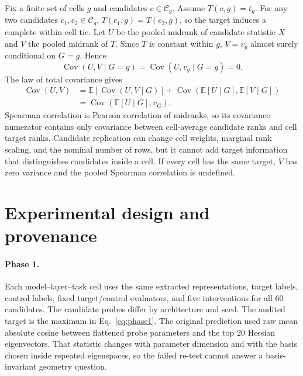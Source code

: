 \documentclass{article}
\begin{document}
Fix a finite set of cells $g$ and candidates $c\in\mathcal C_g$. Assume $T(c,g)=t_g$. For any two candidates $c_1,c_2\in\mathcal C_g$, $T(c_1,g)=T(c_2,g)$, so the target induces a complete within-cell tie. Let $U$ be the pooled midrank of candidate statistic $X$ and $V$ the pooled midrank of $T$. Since $T$ is constant within $g$, $V=v_g$ almost surely conditional on $G=g$. Hence
\[
\operatorname{Cov}(U,V\mid G=g)
=\operatorname{Cov}(U,v_g\mid G=g)=0.
\]
The law of total covariance gives
\begin{align*}
\operatorname{Cov}(U,V)
&=\mathbb E[\operatorname{Cov}(U,V\mid G)]
+\operatorname{Cov}(\mathbb E[U\mid G],\mathbb E[V\mid G])\\
&=\operatorname{Cov}(\mathbb E[U\mid G],v_G).
\end{align*}
Spearman correlation is Pearson correlation of midranks, so its covariance numerator contains only covariance between cell-average candidate ranks and cell target ranks. Candidate replication can change cell weights, marginal rank scaling, and the nominal number of rows, but it cannot add target information that distinguishes candidates inside a cell. If every cell has the same target, $V$ has zero variance and the pooled Spearman correlation is undefined.

\section{Experimental design and provenance}
\label{app:design}

\paragraph{Phase 1.}
Each model--layer--task cell uses the same extracted representations, target labels, control labels, fixed target/control evaluators, and five interventions for all 60 candidates. The candidate probes differ by architecture and seed. The audited target is the maximum in Eq.~\ref{eq:phase1}. The original prediction used raw mean absolute cosine between flattened probe parameters and the top 20 Hessian eigenvectors. That statistic changes with parameter dimension and with the basis chosen inside repeated eigenspaces, so the failed re-test cannot answer a basis-invariant geometry question.
\end{document}
